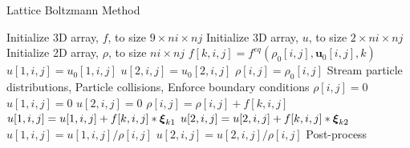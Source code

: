 \begin{algorithm}
\caption{Lattice Boltzmann Method} \label{algo:lbm}
\begin{algorithmic}[1]
   
\Statex {}
\State Initialize 3D array, $f$, to size $9 \times ni \times nj$
\State Initialize 3D array, $u$, to size $2 \times ni \times nj$
\State Initialize 2D array, $\rho$, to size $ni \times nj$
 
      \State $f[k, i, j] = f^{eq}(\rho_0[i, j], \mathbf{u}_0[i, j], k)$ 
    \EndFor
    \State $u[1, i, j] = u_0[1, i, j]$ 
    \State $u[2, i, j] = u_0[2, i, j]$
    \State $\rho[i, j] = \rho_0[i, j]$
  \EndIf
\EndFor
\Statex {}
  \State Stream particle distributions, 
  \State Particle collisions, 
  \State Enforce boundary conditions
  \Statex {}
      \State $\rho[i, j] = 0$
      \State $u[1, i, j] = 0$
      \State $u[2, i, j] = 0$
        \State $\rho[i, j] = \rho[i, j] + f[k, i, j]$
        \State $u[1, i, j] = u[1, i, j] + f[k, i, j] * \boldsymbol{\xi}_{k1}$
        \State $u[2, i, j] = u[2, i, j] + f[k, i, j] * \boldsymbol{\xi}_{k2}$
      \EndFor
        \State $u[1, i, j] = u[1, i, j] / \rho[i, j]$
        \State $u[2, i, j] = u[2, i, j] / \rho[i, j]$
      \EndIf
    \EndIf
  \EndFor
\EndFor
\Statex
\State Post-process
\EndProcedure
\end{algorithmic}
\end{algorithm}
